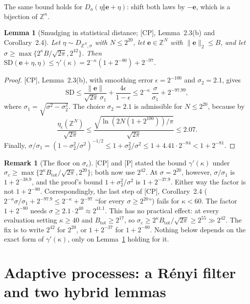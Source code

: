\documentclass[11pt]{article}
\theoremstyle{definition}
\newtheorem{remark}[definition]{Remark}
\theoremstyle{plain}
\newtheorem{lemma}[definition]{Lemma}
\newcommand{\Z}{\mathbb{Z}}
\newcommand{\nrm}[1]{\lVert #1\rVert}
\newcommand{\SD}{\mathrm{SD}}
\newcommand{\Btot}{B_{\mathrm{tot}}}
\newcommand{\CP}{\textup{[CP]}}
\newcommand{\Pp}{\textup{[P]}}
\begin{document}
The same bound holds for $D_a(\eta\Vert\mathbf e+\eta)$: shift both laws by $-\mathbf e$, which is a bijection of $\Z^n$.

\begin{lemma}[Smudging in statistical distance; \CP, Lemma~2.3(b) and Corollary~2.4]\label{lem:sdsmudge}
Let $\eta\sim D_{\Z^N,\sigma}$ with $N\le2^{20}$, let $\mathbf e\in\Z^N$ with $\nrm{\mathbf e}_2\le B$, and let $\sigma\ge\max\{2^\kappa B/\sqrt{2\pi},2^{42}\}$. Then $\SD(\mathbf e+\eta,\eta)\le\gamma'(\kappa)=2^{-\kappa}(1+2^{-80})+2^{-97}$.
\end{lemma}
\begin{proof}
\CP, Lemma~2.3(b), with smoothing error $\epsilon=2^{-100}$ and $\sigma_2=2.1$, gives
\[
  \SD\le\frac{\nrm{\mathbf e}}{\sqrt{2\pi}\,\sigma_1}+\frac{4\epsilon}{1-\epsilon}\le2^{-\kappa}\,\frac\sigma{\sigma_1}+2^{-97.99},
\]
where $\sigma_1=\sqrt{\sigma^2-\sigma_2^2}$. The choice $\sigma_2=2.1$ is admissible for $N\le2^{20}$, because by~\cite[Lemma~3.3]{MR07}
\[
  \frac{\eta_\epsilon(\Z^N)}{\sqrt{2\pi}}\le\frac{\sqrt{\ln(2N(1+2^{100}))/\pi}}{\sqrt{2\pi}}\le2.07 .
\]
Finally, $\sigma/\sigma_1=(1-\sigma_2^2/\sigma^2)^{-1/2}\le1+\sigma_2^2/\sigma^2\le1+4.41\cdot2^{-84}<1+2^{-81}$.
\end{proof}

\begin{remark}[The floor on $\sigma_c$]\label{rem:floor}
\CP{} and \Pp{} stated the bound $\gamma'(\kappa)$ under $\sigma_c\ge\max\{2^\kappa\Btot/\sqrt{2\pi},2^{20}\}$; both now use $2^{42}$. At $\sigma=2^{20}$, however, $\sigma/\sigma_1$ is $1+2^{-38.9}$, and the proof's bound $1+\sigma_2^2/\sigma^2$ is $1+2^{-37.9}$. Either way the factor is not $1+2^{-80}$. Correspondingly, the last step of \CP, Corollary~2.4 ($2^{-\kappa}\sigma/\sigma_1+2^{-97.9}\le2^{-\kappa}+2^{-97}$ ``for every $\sigma\ge2^{20}$'') fails for $\kappa<60$. The factor $1+2^{-80}$ needs $\sigma\ge2.1\cdot2^{40}\approx2^{41.1}$. This has no practical effect: at every evaluation setting $\kappa\ge40$ and $\Btot\ge2^{17}$, so $\sigma_c\ge2^{\kappa}\Btot/\sqrt{2\pi}\ge2^{55}\gg2^{42}$. The fix is to write $2^{42}$ for $2^{20}$, or $1+2^{-37}$ for $1+2^{-80}$. Nothing below depends on the exact form of $\gamma'(\kappa)$, only on Lemma~\ref{lem:sdsmudge} holding for it.
\end{remark}

\section{Adaptive processes: a R\'enyi filter and two hybrid lemmas}
\label{sec:adaptive}
\end{document}
